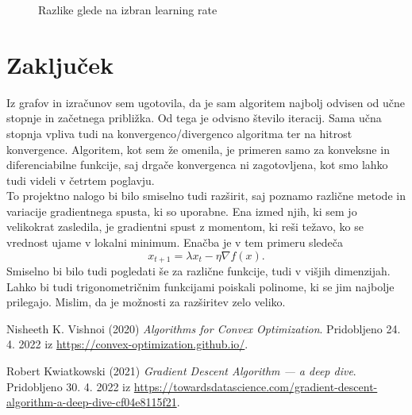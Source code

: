 \documentclass{article}
\begin{document}
\begin{figure}[h]
    \centering
    \caption{Razlike glede na izbran learning rate}
    \label{fig:foobar}
\end{figure}

\newpage
\section{Zaključek}
Iz grafov in izračunov sem ugotovila, da je sam algoritem najbolj odvisen od učne stopnje in začetnega približka. Od tega je odvisno število iteracij. Sama učna stopnja vpliva tudi na konvergenco/divergenco algoritma ter na hitrost konvergence. Algoritem, kot sem že omenila, je primeren samo za konveksne in diferenciabilne funkcije, saj drgače konvergenca ni zagotovljena, kot smo lahko tudi videli v četrtem poglavju. \\
To projektno nalogo bi bilo smiselno tudi razširit, saj poznamo različne metode in variacije gradientnega spusta, ki so uporabne. Ena izmed njih, ki sem jo velikokrat zasledila, je gradientni spust z momentom, ki reši težavo, ko se vrednost ujame v lokalni minimum. Enačba je v tem primeru sledeča
\[ x_{t+1} =\lambda x_t - \eta {\nabla f(x)}.\]
Smiselno bi bilo tudi pogledati še za različne funkcije, tudi v višjih dimenzijah. Lahko bi tudi trigonometričnim funkcijami poiskali polinome, ki se jim najbolje prilegajo. Mislim, da je možnosti za razširitev zelo veliko.



\pagebreak
\begin{thebibliography}{9}
Nisheeth K. Vishnoi (2020) \emph{Algorithms for Convex Optimization}. Pridobljeno 24. 4. 2022 iz \url{https://convex-optimization.github.io/}.

Robert Kwiatkowski (2021) \emph{Gradient Descent Algorithm — a deep dive}. Pridobljeno 30. 4. 2022 iz \url{https://towardsdatascience.com/gradient-descent-algorithm-a-deep-dive-cf04e8115f21}.

\end{thebibliography}
\end{document}
